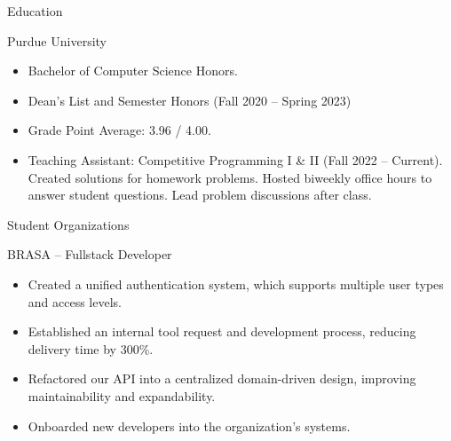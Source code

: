 \documentclass[]{article}
\newlength{\tabin}
\newlength{\secsep}
\newcommand{\lineunder}{\vspace*{-8pt} \\ \hspace*{-6pt} \hrulefill \\ \vspace*{-15pt}}
\newenvironment{tabbedsection}[1]{
  \begin{list}{}{
      \setlength{\itemsep}{0pt}
      \setlength{\labelsep}{0pt}
      \setlength{\labelwidth}{0pt}
      \setlength{\leftmargin}{\tabin}
      \setlength{\rightmargin}{\tabin}
      \setlength{\listparindent}{0pt}
      \setlength{\parsep}{0pt}
      \setlength{\parskip}{0pt}
      \setlength{\partopsep}{0pt}
      \setlength{\topsep}{#1}
    }
  \item[]
}{\end{list}}
\newenvironment{resume_section}[1]{
  \filbreak
  \vspace{2\secsep}
  \textsc{\large#1}
  \lineunder
  \begin{tabbedsection}{\secsep}
}{\end{tabbedsection}}
\newenvironment{resume_subsection}[2][]{
  \textbf{#2} \hfill {\footnotesize #1} \hspace{2em}
  \begin{tabbedsection}{0.5\secsep}
}{\end{tabbedsection}}
\newenvironment{subitems}{
  \renewcommand{\labelitemi}{-}
  \begin{itemize}
      \setlength{\labelsep}{1em}
}{\end{itemize}}
\begin{document}

\begin{resume_section}{Education}

	\begin{resume_subsection}{Purdue University}

		\begin{subitems}

			\item Bachelor of Computer Science Honors.
			
			\item Dean's List and Semester Honors (Fall 2020 -- Spring 2023)

			\item Grade Point Average: 3.96 / 4.00.

			\item Teaching Assistant: Competitive Programming I \& II (Fall 2022 -- Current).
			Created solutions for homework problems. Hosted biweekly office hours to answer
			student questions. Lead problem discussions after class.

		\end{subitems}

	\end{resume_subsection}

\end{resume_section}


\begin{resume_section}{Student Organizations}

	\begin{resume_subsection}[Remote (2021.08 -- 2022.08)]{BRASA -- Fullstack Developer}

		\begin{subitems}

			\item Created a unified authentication system, which supports multiple user types and
			access levels.

			\item Established an internal tool request and development process, reducing delivery
			time by 300\%.

			\item Refactored our API into a centralized domain-driven design, improving
			maintainability and expandability.

			\item Onboarded new developers into the organization's systems.

		\end{subitems}

	\end{resume_subsection}

\end{resume_section}
\end{document}
